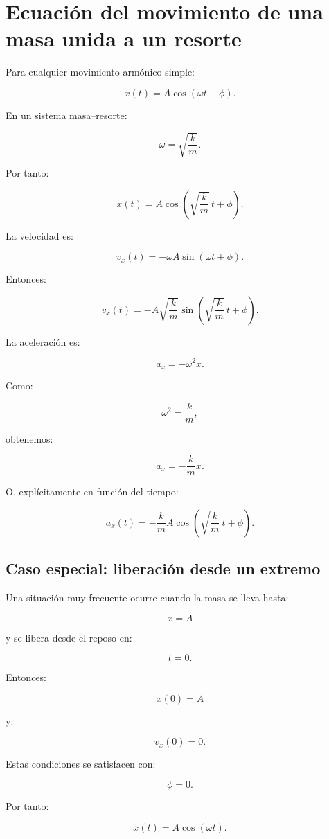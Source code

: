 \section{Ecuación del movimiento de una masa unida a un resorte}

Para cualquier movimiento armónico simple:

\[ x(t)=A\cos(\omega t+\phi). \]

En un sistema masa--resorte:

\[ \omega=\sqrt{\frac{k}{m}}. \]

Por tanto:

\[ \boxed{x(t)=A\cos\left(\sqrt{\frac{k}{m}}\,t+\phi\right)}. \]

La velocidad es:

\[ v_x(t)=-\omega A\sin(\omega t+\phi). \]

Entonces:

\[ \boxed{v_x(t)=-A\sqrt{\frac{k}{m}}\sin\left(\sqrt{\frac{k}{m}}\,t+\phi\right)}. \]

La aceleración es:

\[ a_x=-\omega^2x. \]

Como:

\[ \omega^2=\frac{k}{m}, \]

obtenemos:

\[ \boxed{a_x=-\frac{k}{m}x}. \]

O, explícitamente en función del tiempo:

\[ \boxed{a_x(t)=-\frac{k}{m}A\cos\left(\sqrt{\frac{k}{m}}\,t+\phi\right)}. \]


\subsection{Caso especial: liberación desde un extremo}

Una situación muy frecuente ocurre cuando la masa se lleva hasta:

\[ x=A \]

y se libera desde el reposo en:

\[ t=0. \]

Entonces:

\[ x(0)=A \]

y:

\[ v_x(0)=0. \]

Estas condiciones se satisfacen con:

\[ \phi=0. \]

Por tanto:

\[ \boxed{x(t)=A\cos(\omega t)}. \]

